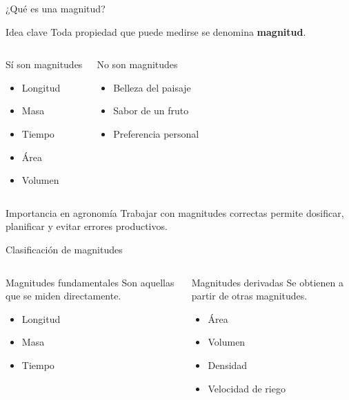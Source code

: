 \documentclass[handout,aspectratio=169,10pt]{beamer}
\newcommand{\idea}[1]{
	\begin{block}{Idea clave}
		#1
	\end{block}
}
\begin{document}
	\begin{frame}{¿Qué es una magnitud?}
		\idea{Toda propiedad que puede medirse se denomina \textbf{magnitud}.}
		
		\begin{columns}[T]
			\begin{block}{Sí son magnitudes}
				\begin{itemize}[<+->]
					\item Longitud
					\item Masa
					\item Tiempo
					\item Área
					\item Volumen
				\end{itemize}
			\end{block}
			
			\begin{alertblock}{No son magnitudes}
				\begin{itemize}[<+->]
					\item Belleza del paisaje
					\item Sabor de un fruto
					\item Preferencia personal
				\end{itemize}
			\end{alertblock}
		\end{columns}
		
		\pause
		\begin{block}{Importancia en agronomía}
			Trabajar con magnitudes correctas permite dosificar, planificar y evitar errores productivos.
		\end{block}
	\end{frame}
	
	\begin{frame}{Clasificación de magnitudes}
		\begin{columns}[T]
			\begin{block}{Magnitudes fundamentales}
				Son aquellas que se miden directamente.
				\begin{itemize}[<+->]
					\item Longitud
					\item Masa
					\item Tiempo
				\end{itemize}
			\end{block}
			
			\begin{block}{Magnitudes derivadas}
				Se obtienen a partir de otras magnitudes.
				\begin{itemize}[<+->]
					\item Área
					\item Volumen
					\item Densidad
					\item Velocidad de riego
				\end{itemize}
			\end{block}
		\end{columns}
	\end{frame}
	
\end{document}

